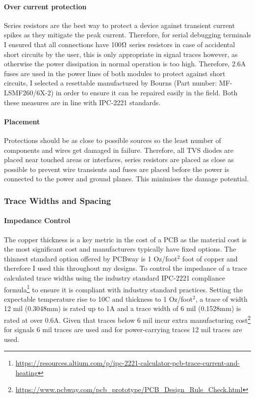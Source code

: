 \paragraph{Over current protection}
Series resistors are the best way to protect a device against transient current spikes as they mitigate the peak current. Therefore, for serial debugging terminals I ensured that all connections have 100$\ohm$ series resistors in case of accidental short circuits by the user, this is only appropriate in signal traces however, as otherwise the power dissipation in normal operation is too high. Therefore, 2.6A fuses are used in the power lines of both modules to protect against short circuits, I selected a resettable manufactured by Bourns (Part number: MF-LSMF260/6X-2) in order to ensure it can be repaired easily in the field. Both these measures are in line with IPC-2221 standards.
\paragraph{Placement}
Protections should be as close to possible sources so the least number of components and wires get damaged in failure. Therefore, all \gls{TVS} diodes are placed near touched areas or interfaces, series resistors are placed as close as possible to prevent wire transients and fuses are placed before the power is connected to the power and ground planes. This minimises the damage potential.

\subsubsection{Trace Widths and Spacing}\label{sub_sub_section:tgt_trace_width}
\paragraph{Impedance Control}
The copper thickness is a key metric in the cost of a \gls{PCB} as the material cost is the most significant cost and manufacturers typically have fixed options. The thinnest standard option offered by PCBway is 1 Oz/foot$^2$ foot of copper and therefore I used this throughout my designs. To control the impedance of a trace calculated trace widths using the industry standard IPC-2221 compliance formula\footnote{\url{https://resources.altium.com/p/ipc-2221-calculator-pcb-trace-current-and-heating}} to ensure it is compliant with industry standard practices. Setting the expectable temperature rise to 10\degree C and thickness to 1 Oz/foot$^2$, a trace of width 12 mil (0.3048mm) is rated up to 1A and a trace width of 6 mil (0.1528mm) is rated at over 0.6A. Given that traces below 6 mil incur extra manufacturing cost\footnote{\url{https://www.pcbway.com/pcb_prototype/PCB_Design_Rule_Check.html}} for signals 6 mil traces are used and for power-carrying traces 12 mil traces are used.

